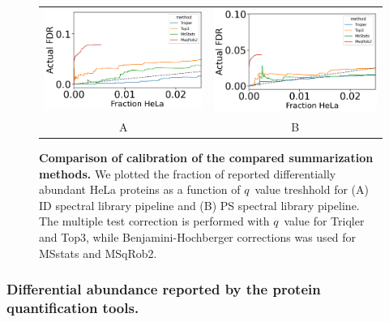 \documentclass[10pt,letterpaper]{article}
\begin{document}

\begin{figure}[hbt]
    \centering
    \begin{tabular}{cc} 
        \includegraphics[width=0.5\linewidth]{../../result/report_plots_pipeline/calibration_ID_0.48.png} & 
        \includegraphics[width=0.5\linewidth]{../../result/report_plots_pipeline/calibration_PS_0.48.png} \\
        A & B
    \end{tabular}
  \caption{{\bf Comparison of calibration of the compared summarization methods.} We plotted the fraction of reported differentially abundant HeLa proteins as a function of $q$~value treshhold for (A) ID spectral library pipeline and (B) PS spectral library pipeline. The multiple test correction is performed with $q$~value for Triqler and Top3, while Benjamini-Hochberger corrections was used for MSstats and MSqRob2. \label{fig:frac_hela_vs_fdr}}
\end{figure}

\subsubsection*{Differential abundance reported by the protein quantification tools.}
\end{document}
